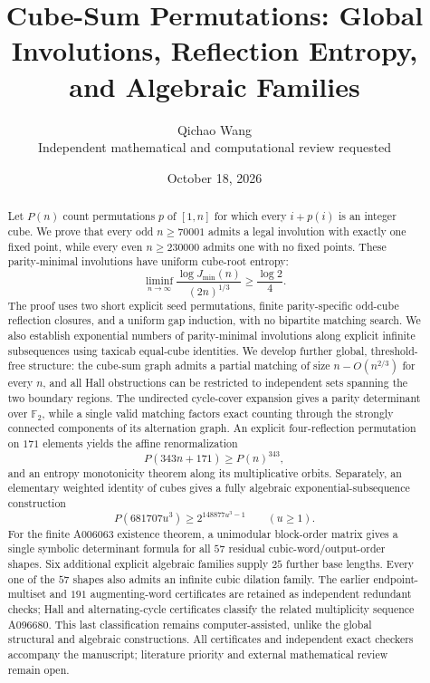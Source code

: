 \documentclass[10pt]{article}
\title{Cube-Sum Permutations: Global Involutions, Reflection Entropy, and Algebraic Families}
\author{Qichao Wang\\
\small Independent mathematical and computational review requested}
\date{October 18, 2026}
\begin{document}
\maketitle
\begin{abstract}
Let $P(n)$ count permutations $p$ of $[1,n]$
for which every $i+p(i)$ is an integer cube.
We prove that every odd $n\ge70001$ admits
a legal involution with exactly one fixed
point, while every even $n\ge230000$
admits one with no fixed points.
These parity-minimal involutions have
uniform cube-root entropy:
\[
\liminf_{n\to\infty}
\frac{\log J_{\min}(n)}{(2n)^{1/3}}
\ge\frac{\log2}{4}.
\]
The proof uses two short explicit
seed permutations, finite parity-specific
odd-cube reflection closures, and a
uniform gap induction, with no
bipartite matching search.
We also establish exponential numbers
of parity-minimal involutions along
explicit infinite subsequences
using taxicab equal-cube identities.
We develop further global, threshold-free structure:
the cube-sum graph admits a partial matching
of size $n-O(n^{2/3})$ for every $n$,
and all Hall obstructions can be restricted
to independent sets spanning the two
boundary regions. The undirected cycle-cover
expansion gives a parity determinant over
$\mathbb F_2$, while a single valid matching
factors exact counting through the strongly
connected components of its alternation graph.
An explicit four-reflection permutation
on $171$ elements yields the affine
renormalization
\[
P(343n+171)\ge P(n)^{343},
\]
and an entropy monotonicity theorem along
its multiplicative orbits.
Separately, an elementary weighted identity
of cubes gives a fully algebraic
exponential-subsequence construction
\[
P(681707u^3)\ge2^{148877u^3-1}
\qquad(u\ge1).
\]
For the finite A006063 existence theorem, a
unimodular block-order matrix gives a
single symbolic determinant formula for
all $57$ residual cubic-word/output-order
shapes. Six additional explicit algebraic
families supply $25$ further base lengths.
Every one of the $57$ shapes also admits an
infinite cubic dilation family.
The earlier endpoint-multiset and $191$
augmenting-word certificates are retained
as independent redundant checks;
Hall and
alternating-cycle certificates classify
the related multiplicity sequence A096680.
This last classification remains
computer-assisted, unlike the global
structural and algebraic constructions.
All certificates and independent exact
checkers accompany the manuscript;
literature priority and external
mathematical review remain open.
\end{abstract}
\end{document}
